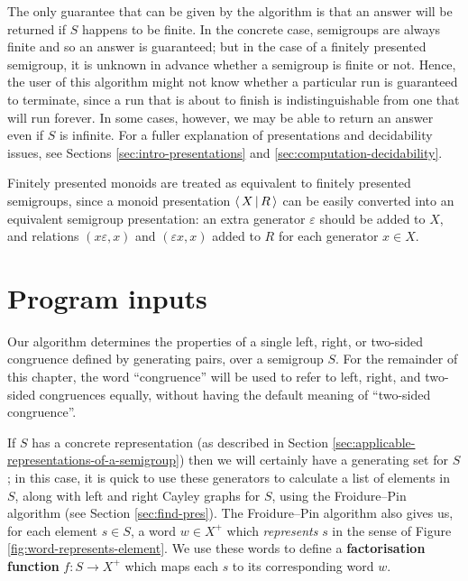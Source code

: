The only guarantee that can be given by the algorithm is that an answer will be
returned if $S$ happens to be finite.  In the concrete case, semigroups are
always finite and so an answer is guaranteed; but in the case of a finitely
presented semigroup, it is unknown in advance whether a semigroup is finite or
not.  Hence, the user of this algorithm might not know whether a particular run
is guaranteed to terminate, since a run that is about to finish is
indistinguishable from one that will run forever.  In some cases, however, we
may be able to return an answer even if $S$ is infinite.  For a fuller
explanation of presentations and decidability issues, see Sections
\ref{sec:intro-presentations} and \ref{sec:computation-decidability}.

Finitely presented monoids are treated as equivalent to finitely presented
semigroups, since a monoid presentation $\left\langle \, X \, \middle| \, R \, \right\rangle$ can be easily converted into
an equivalent semigroup presentation: an extra generator $\varepsilon$ should be
added to $X$, and relations $(x \varepsilon,x)$ and $(\varepsilon x,x)$ added to
$R$ for each generator $x \in X$.

\section{Program inputs}
\label{sec:program-inputs}

Our algorithm determines the properties of a single left, right, or two-sided
congruence defined by generating pairs, over a semigroup $S$.
For the remainder of this chapter, the word ``congruence'' will be used to refer
to left, right, and two-sided congruences equally, without having the default
meaning of ``two-sided congruence''.

If $S$ has a concrete representation (as described in Section
\ref{sec:applicable-representations-of-a-semigroup}) then we will certainly
have a generating set for $S$; in this case, it is quick to use these generators
to calculate a list of elements in $S$, along with left and right Cayley graphs
for $S$, using the Froidure--Pin algorithm (see Section \ref{sec:find-pres}).
The Froidure--Pin algorithm also gives us, for each element $s \in S$, a word
$w \in X^+$ which \textit{represents} $s$ in the sense of Figure
\ref{fig:word-represents-element}.  We use these words to define a
\textbf{factorisation function} $f : S \to X^+$ which maps each $s$ to its
corresponding word $w$.

